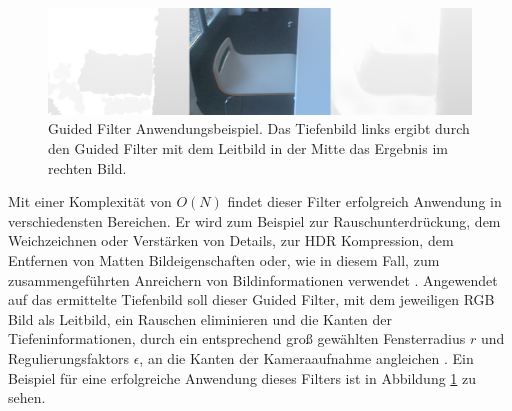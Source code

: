 \begin{figure}[h]
  \centering
	\includegraphics[width=1.0\textwidth]{content/images/methods/gf-result.png} 
  \caption{Guided Filter Anwendungsbeispiel. Das Tiefenbild links ergibt durch den Guided Filter mit dem Leitbild in der Mitte das Ergebnis im rechten Bild.}
  \label{fig:gf-result}
\end{figure}

Mit einer Komplexität von \(O(N)\) findet dieser Filter erfolgreich Anwendung  in verschiedensten Bereichen. Er wird zum Beispiel zur Rauschunterdrückung, dem Weichzeichnen oder Verstärken von Details, zur HDR Kompression, dem Entfernen von Matten Bildeigenschaften oder, wie in diesem Fall, zum zusammengeführten Anreichern von Bildinformationen verwendet \citep{he2010guided}. Angewendet auf das ermittelte Tiefenbild soll dieser Guided Filter, mit dem jeweiligen RGB Bild als Leitbild, ein Rauschen eliminieren und die Kanten der Tiefeninformationen, durch ein entsprechend groß gewählten Fensterradius \(r\) und Regulierungsfaktors \(\epsilon\), an die Kanten der Kameraaufnahme angleichen \citep{liu2012guided}. Ein Beispiel für eine erfolgreiche Anwendung dieses Filters ist in Abbildung \ref{fig:gf-result} zu sehen.


